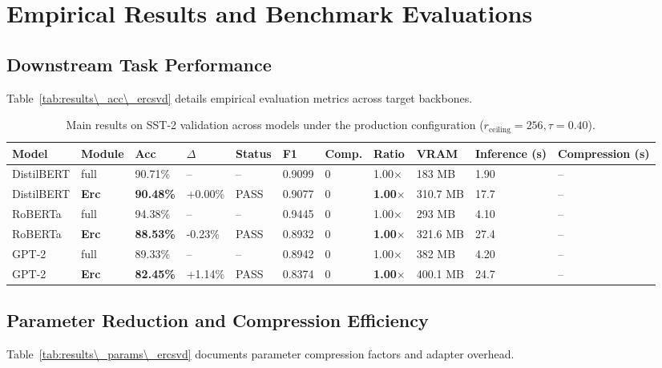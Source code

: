 \section{Empirical Results and Benchmark Evaluations}

\subsection{Downstream Task Performance}
Table~\ref{tab:results\_acc\_ercsvd} details empirical evaluation metrics across target backbones.

\begin{table}[t]
\centering
\small
\begin{tabular}{lllllllllll}
\toprule
\textbf{Model} & \textbf{Module} & \textbf{Acc} & \textbf{$\Delta$} & \textbf{Status} & \textbf{F1} & \textbf{Comp.} & \textbf{Ratio} & \textbf{VRAM} & \textbf{Inference (s)} & \textbf{Compression (s)} \\
\midrule
DistilBERT & full & 90.71\% & -- & -- & 0.9099 & 0 & 1.00$\times$ & 183 MB & 1.90 & -- \\
DistilBERT & \textbf{Erc} & \textbf{90.48\%} & +0.00\% & PASS & 0.9077 & 0 & \textbf{1.00$\times$} & 310.7 MB & 17.7 & -- \\
RoBERTa & full & 94.38\% & -- & -- & 0.9445 & 0 & 1.00$\times$ & 293 MB & 4.10 & -- \\
RoBERTa & \textbf{Erc} & \textbf{88.53\%} & -0.23\% & PASS & 0.8932 & 0 & \textbf{1.00$\times$} & 321.6 MB & 27.4 & -- \\
GPT-2 & full & 89.33\% & -- & -- & 0.8942 & 0 & 1.00$\times$ & 382 MB & 4.20 & -- \\
GPT-2 & \textbf{Erc} & \textbf{82.45\%} & +1.14\% & PASS & 0.8374 & 0 & \textbf{1.00$\times$} & 400.1 MB & 24.7 & -- \\
\bottomrule
\end{tabular}
\caption{Main results on SST-2 validation across models under the production configuration ($r_{\mathrm{ceiling}}=256, \tau=0.40$).}
\label{tab:main\_sst2}
\end{table}

\subsection{Parameter Reduction and Compression Efficiency}
Table~\ref{tab:results\_params\_ercsvd} documents parameter compression factors and adapter overhead.

